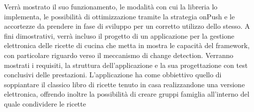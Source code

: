 Verrà mostrato il suo funzionamento, le modalità con cui la libreria lo implementa, le possibilità di ottimizzazione tramite la strategia onPush e le accortezze da prendere in fase di sviluppo per un corretto utilizzo dello stesso.
\newline
A fini dimostrativi, verrà incluso il progetto di un applicazione per la gestione elettronica delle ricette di cucina che metta in mostra le capacità del framework, con particolare riguardo verso il meccanismo di change detection. Verranno mostrati i requisiti, la struttura dell'applicazione e la sua progettazione con test conclusivi delle prestazioni.
L'applicazione ha come obbiettivo quello di soppiantare il classico libro di ricette tenuto in casa realizzandone una versione elettronica, offrendo inoltre la possibilità di creare gruppi famiglia all'interno del quale condividere le ricette


